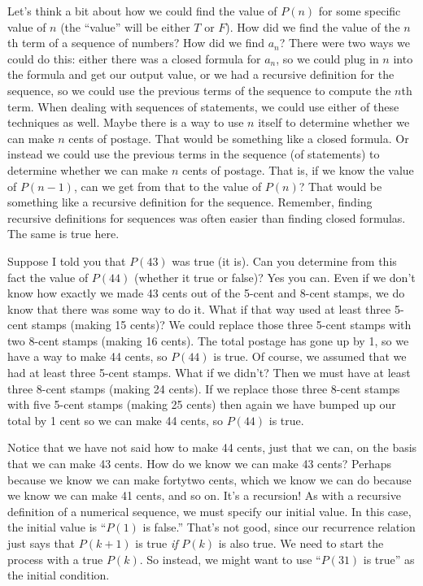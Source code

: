 \documentclass[12pt]{article}
\begin{document}
Let's think a bit about how we could find the value of $P(n)$ for some specific value of $n$ (the ``value'' will be either $T$ or $F$).  How did we find the value of the $n$th term of a sequence of numbers? How did we find $a_n$?  There were two ways we could do this: either there was a closed formula for $a_n$, so we could plug in $n$ into the formula and get our output value, or we had a recursive definition for the sequence, so we could use the previous terms of the sequence to compute the $n$th term.  When dealing with sequences of statements, we could use either of these techniques as well.  Maybe there is a way to use $n$ itself to determine whether we can make $n$ cents of postage.  That would be something like a closed formula.  Or instead we could use the previous terms in the sequence (of statements) to determine whether we can make $n$ cents of postage.  That is, if we know the value of $P(n-1)$, can we get from that to the value of $P(n)$?  That would be something like a recursive definition for the sequence.  Remember, finding recursive definitions for sequences was often easier than finding closed formulas.  The same is true here.

Suppose I told you that $P(43)$ was true (it is).  Can you determine from this fact the value of $P(44)$ (whether it true or false)?  Yes you can. Even if we don't know how exactly we made 43 cents out of the 5-cent and 8-cent stamps, we do know that there was some way to do it.  What if that way used at least three 5-cent stamps  (making 15 cents)?  We could replace those three 5-cent stamps with two 8-cent stamps (making 16 cents).  The total postage has gone up by 1, so we have a way to make 44 cents, so $P(44)$ is true.  Of course, we assumed that we had at least three 5-cent stamps.  What if we didn't? Then we must have at least three 8-cent stamps (making 24 cents).  If we replace those three 8-cent stamps with five 5-cent stamps (making 25 cents) then again we have bumped up our total by 1 cent so we can make 44 cents, so $P(44)$ is true.  

Notice that we have not said how to make 44 cents, just that we can, on the basis that we can make 43 cents.  How do we know we can make 43 cents?  Perhaps because we know we can make \gls{fortytwo} cents, which we know we can do because we know we can make 41 cents, and so on.  It's a recursion!  As with a recursive definition of a numerical sequence, we must specify our initial value.  In this case, the initial value is ``$P(1)$ is false.''  That's not good, since our recurrence relation just says that $P(k+1)$ is true {\em if} $P(k)$ is also true.  We need to start the process with a true $P(k)$.  So instead, we might want to use ``$P(31)$ is true'' as the initial condition.
\end{document}
